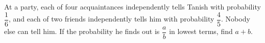 At a party, each of four acquaintances independently tells Tanish with probability $\dfrac{1}{6}$, and each of two friends independently tells him with probability $\dfrac{4}{5}$. Nobody else can tell him. If the probability he finds out is $\dfrac{a}{b}$ in lowest terms, find $a+b$.
